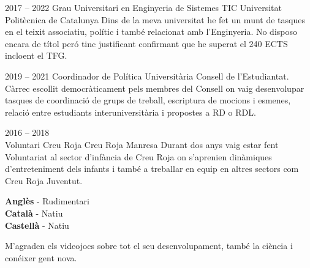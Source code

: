 \documentclass[9pt]{developercv} %
\begin{document}

\begin{entrylist}
	\entry
	{2017 -- 2022}
	{Grau Universitari en Enginyeria de Sistemes TIC}
	{Universitat Politècnica de Catalunya}
	{Dins de la meva universitat he fet un munt de tasques en el teixit associatiu, polític i també
		relacionat amb l’Enginyeria. No disposo encara de títol peró tinc justificant confirmant que he superat el 240 ECTS incloent el TFG.}
\end{entrylist}


\begin{entrylist}
	\entry
	{2019 -- 2021}
	{Coordinador de Política Universitària}
	{Consell de l'Estudiantat.}
	{ Càrrec escollit democràticament pels membres del Consell on vaig desenvolupar tasques de
		coordinació de grups de treball, escriptura de mocions i esmenes, relació entre estudiants
		interuniversitària i propostes a RD o RDL.
		\\ }

	\entry
	{2016 -- 2018\\}
	{Voluntari Creu Roja}
	{Creu Roja Manresa}
	{Durant dos anys vaig estar fent Voluntariat al sector d’infància de Creu Roja on s’aprenien
		dinàmiques d’entreteniment dels infants i també a treballar en equip en altres sectors com Creu
		Roja Juventut. \\ }
\end{entrylist}

\begin{minipage}[t]{0.3\textwidth}
	\vspace{-\baselineskip} %


	\textbf{Anglès} - Rudimentari\\
	\textbf{Català} - Natiu\\
	\textbf{Castellà} - Natiu
\end{minipage}
\hfill
\begin{minipage}[t]{0.3\textwidth}
	\vspace{-\baselineskip} %


	M'agraden els videojocs sobre tot el seu desenvolupament, també la ciència i conéixer gent nova.

\end{minipage}
\hfill

\end{document}

